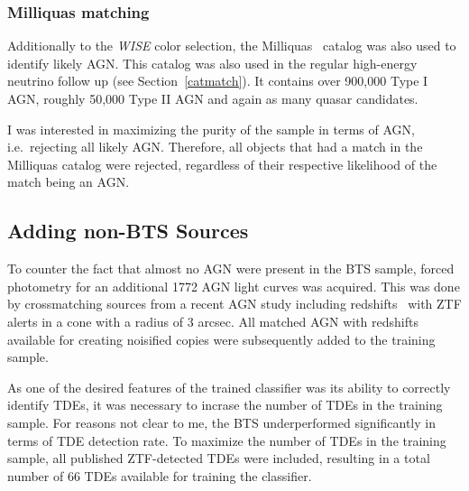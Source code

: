 \subsubsection{Milliquas matching}\label{milliquas_cut}
Additionally to the \textit{WISE} color selection, the Milliquas~\cite{Milliquas} catalog was also used to identify likely AGN. This catalog was also used in the regular high-energy neutrino follow up (see Section~\ref{catmatch}). It contains over 900,000 Type I AGN, roughly 50,000 Type II AGN and again as many quasar candidates.

I was interested in maximizing the purity of the sample in terms of AGN, i.e.~rejecting all likely AGN. Therefore, all objects that had a match in the Milliquas catalog were rejected, regardless of their respective likelihood of the match being an AGN.

\subsection{Adding non-BTS Sources}\label{addsources}
To counter the fact that almost no AGN were present in the BTS sample, forced photometry for an additional 1772 AGN light curves was acquired. This was done by crossmatching sources from a recent AGN study including redshifts~ with ZTF alerts in a cone with a radius of 3 arcsec. All matched AGN with redshifts available for creating noisified copies were subsequently added to the training sample.

As one of the desired features of the trained classifier was its ability to correctly identify TDEs, it was necessary to incrase the number of TDEs in the training sample. For reasons not clear to me, the BTS underperformed significantly in terms of TDE detection rate. To maximize the number of TDEs in the training sample, all published ZTF-detected TDEs were included, resulting in a total number of 66 TDEs available for training the classifier.

